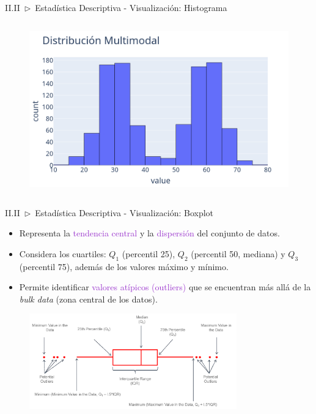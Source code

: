 \documentclass[xcolor=dvipsnames]{beamer}
\begin{document}
\begin{frame}{II.II~$\rhd$~Estadística Descriptiva - Visualización: Histograma}
\begin{columns}
\begin{figure}
                \includegraphics[width=\textwidth]{imgs/plots/histplot_05.png}
            \end{figure}
        \end{columns}
    \end{frame}

    \begin{frame}{II.II~$\rhd$~Estadística Descriptiva - Visualización: Boxplot}
        \begin{itemize}
            \item Representa la \textcolor{DarkOrchid}{tendencia central} y la \textcolor{DarkOrchid}{dispersión} del conjunto de datos.
            \vspace{2mm}%
            \item Considera los cuartiles: $Q_{1}$ (percentil 25), $Q_{2}$ (percentil 50, mediana) y $Q_{3}$ (percentil 75), además de los valores máximo y mínimo.
            \vspace{2mm}%
            \item Permite identificar \textcolor{DarkOrchid}{valores atípicos (outliers)} que se encuentran más allá de la \textit{bulk data} (zona central de los datos).
        \end{itemize}
        \vspace{5mm}%
        \begin{figure}
            \centering
            \includegraphics[width=0.8\textwidth]{imgs/t1_img4.png}
        \end{figure}
    \end{frame}
\end{document}
